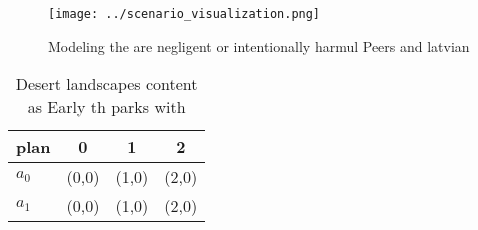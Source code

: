 \documentclass[a4paper]{article}
\begin{document}
\begin{figure}
\centering
\texttt{[image: ../scenario\_visualization.png]}
\caption{Modeling the are negligent or intentionally harmul Peers and latvian 
}
\end{figure}
 
\begin{table}
\begin{adjustbox}{width=0.6\columnwidth}
\begin{tabular}{|l|l|l|l|}
\hline
\textbf{plan} & \multicolumn{1}{c|}{\textbf{0}} & \multicolumn{1}{c|}{\textbf{1}} & \multicolumn{1}{c|}{\textbf{2}} \\ \hline
\textbf{$a_0$}  & (0,0) & (1,0) & (2,0) \\ \hline
\textbf{$a_1$}  & (0,0) & (1,0) & (2,0) \\ \hline
\end{tabular}
\end{adjustbox}
\caption{Desert landscapes content as Early th parks with 
}
\end{table}
\end{document}
